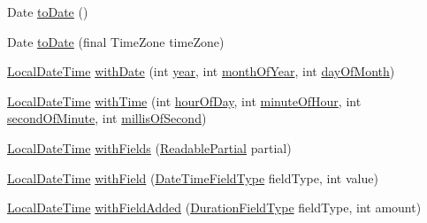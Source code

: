 \begin{DoxyCompactItemize}
\item 
Date \hyperlink{classorg_1_1joda_1_1time_1_1_local_date_time_a268c6960a26e326d40e107abdf5909c4}{to\-Date} ()
\item 
Date \hyperlink{classorg_1_1joda_1_1time_1_1_local_date_time_a8973233e7ba7cac2c23f55a95b79a325}{to\-Date} (final Time\-Zone time\-Zone)
\item 
\hyperlink{classorg_1_1joda_1_1time_1_1_local_date_time}{Local\-Date\-Time} \hyperlink{classorg_1_1joda_1_1time_1_1_local_date_time_af28c7b0cd4ef4dcf4809572ee7358f33}{with\-Date} (int \hyperlink{classorg_1_1joda_1_1time_1_1_local_date_time_a204e5baf4064e68f6643ddc2e5bb5218}{year}, int \hyperlink{classorg_1_1joda_1_1time_1_1_local_date_time_aa150366f50fde648fce8197873491938}{month\-Of\-Year}, int \hyperlink{classorg_1_1joda_1_1time_1_1_local_date_time_abcc5d49a5abca169b71d2a61697ffa47}{day\-Of\-Month})
\item 
\hyperlink{classorg_1_1joda_1_1time_1_1_local_date_time}{Local\-Date\-Time} \hyperlink{classorg_1_1joda_1_1time_1_1_local_date_time_a6b4e934a9e02997a3a8beb9e74dc7dc1}{with\-Time} (int \hyperlink{classorg_1_1joda_1_1time_1_1_local_date_time_a0cef0e3789bc2a1b01172b7247687127}{hour\-Of\-Day}, int \hyperlink{classorg_1_1joda_1_1time_1_1_local_date_time_a6c4f0b7bf43fcef44770d5fe74a7a2eb}{minute\-Of\-Hour}, int \hyperlink{classorg_1_1joda_1_1time_1_1_local_date_time_a2fb8c6e0a7bbd751278fa1eb66211ff7}{second\-Of\-Minute}, int \hyperlink{classorg_1_1joda_1_1time_1_1_local_date_time_a41c1cc944cfbfc3d44361d1066d288ef}{millis\-Of\-Second})
\item 
\hyperlink{classorg_1_1joda_1_1time_1_1_local_date_time}{Local\-Date\-Time} \hyperlink{classorg_1_1joda_1_1time_1_1_local_date_time_a874ede5964491787117ea0b5a5376204}{with\-Fields} (\hyperlink{interfaceorg_1_1joda_1_1time_1_1_readable_partial}{Readable\-Partial} partial)
\item 
\hyperlink{classorg_1_1joda_1_1time_1_1_local_date_time}{Local\-Date\-Time} \hyperlink{classorg_1_1joda_1_1time_1_1_local_date_time_a9cfb6b870329800000190b76cccebab9}{with\-Field} (\hyperlink{classorg_1_1joda_1_1time_1_1_date_time_field_type}{Date\-Time\-Field\-Type} field\-Type, int value)
\item 
\hyperlink{classorg_1_1joda_1_1time_1_1_local_date_time}{Local\-Date\-Time} \hyperlink{classorg_1_1joda_1_1time_1_1_local_date_time_ab660a8c3a9a05725419f8a715d003c45}{with\-Field\-Added} (\hyperlink{classorg_1_1joda_1_1time_1_1_duration_field_type}{Duration\-Field\-Type} field\-Type, int amount)
\item 

\end{DoxyCompactItemize}
